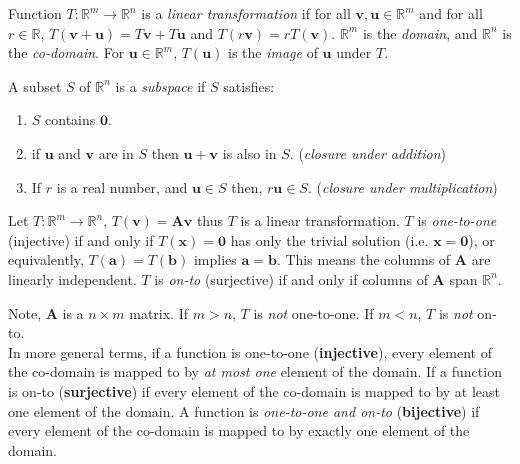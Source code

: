 \begin{definition}
Function $T:\mathbb{R}^m\rightarrow\mathbb{R}^n$ is a \emph{linear transformation} if for all $\bm{v},\bm{u}\in\mathbb{R}^{m}$ and for all $r\in\mathbb{R}$, $T(\bm{v}+\bm{u})=T\bm{v}+T\bm{u}$ and $T(r\bm{v}) = rT(\bm{v})$.
$\mathbb{R}^m$ is the \emph{domain}, and $\mathbb{R}^n$ is the \emph{co-domain}. For $\bm{u}\in\mathbb{R}^m$, $T(\bm{u})$ is the \emph{image} of $\bm{u}$ under $T$.
\end{definition}

\begin{definition}[Subspace]
A subset $S$ of $\mathbb{R}^n$ is a \emph{subspace} if $S$ satisfies:
\begin{enumerate}[label=\alph*)]
    \item $S$ contains $\bm{0}$.
    \item if $\bm{u}$ and $\bm{v}$ are in $S$ then $\bm{u}+\bm{v}$ is also in $S$. (\emph{closure under addition})
    \item If $r$ is a real number, and $\bm{u}\in S$ then, $r\bm{u}\in S$. (\emph{closure under multiplication})
\end{enumerate}
\end{definition}

\begin{definition}
 Let $T:\mathbb{R}^m\rightarrow\mathbb{R}^n$, $T(\bm{v})=\bm{A}\bm{v}$ thus $T$ is a linear transformation. $T$ is \emph{one-to-one} (injective) if and only if $T(\bm{x})=\bm{0}$ has only the trivial solution (i.e. $\bm{x}=\bm{0}$), or equivalently, $T(\bm{a})=T(\bm{b})$ implies $\bm{a}=\bm{b}$. This means the columns of $\bm{A}$ are linearly independent. $T$ is \emph{on-to} (surjective) if and only if columns of $\bm{A}$ span $\mathbb{R}^n$.
\end{definition}

Note, $\bm{A}$ is a $n\times m$ matrix.
If $m>n$, $T$ is \emph{not} one-to-one.
If $m<n$, $T$ is \emph{not} on-to.\\

In more general terms, if a function is one-to-one (\textbf{injective}), every element of the co-domain is mapped to by \textit{at most one} element of the domain. If a function is on-to (\textbf{surjective}) if every element of the co-domain is mapped to by at least one element of the domain. A function is \emph{one-to-one and on-to} (\textbf{bijective}) if every element of the co-domain is mapped to by exactly one element of the domain.